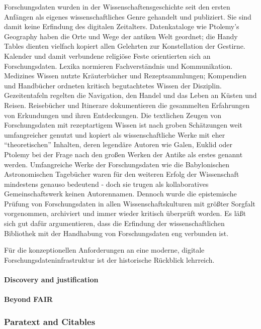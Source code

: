 Forschungsdaten wurden in der Wissenschaftensgeschichte seit den ersten
Anfängen als eigenes wissenschaftliches Genre gehandelt und publiziert.
Sie sind damit keine Erfindung des digitalen Zeitalters. Datenkataloge
wie Ptolemy's Geography haben die Orte und Wege der antiken Welt
geordnet; die Handy Tables dienten vielfach kopiert allen Gelehrten zur
Konstellation der Gestirne. Kalender und damit verbundene religiöse
Feste orientierten sich an Forschungsdaten. Lexika normieren
Fachverständnis und Kommunikation. Medizines Wissen nutzte Kräuterbücher
und Rezeptsammlungen; Kompendien und Handbücher ordneten kritisch
begutachtetes Wissen der Disziplin. Gezeitentafeln regelten die
Navigation, den Handel und das Leben an Küsten und Reisen. Reisebücher
und Itinerare dokumentieren die gesammelten Erfahrungen von Erkundungen
und ihren Entdeckungen. Die textlichen Zeugen von Forschungsdaten mit
rezeptartigem Wissen ist nach groben Schätzungen weit umfangreicher
genutzt und kopiert als wissenschaftliche Werke mit eher
``theoretischen'' Inhalten, deren legendäre Autoren wie Galen, Euklid
oder Ptolemy bei der Frage nach den großen Werken der Antike als erstes
genannt werden. Umfangreiche Werke der Forschungsdaten wie die
Babylonischen Astronomischen Tagebücher waren für den weiteren Erfolg
der Wissenschaft mindestens genauso bedeutend - doch sie trugen als
kollaboratives Gemeinschaftswerk keinen Autorennamen. Dennoch wurde die
epistemische Prüfung von Forschungsdaten in allen Wissenschaftskulturen
mit größter Sorgfalt vorgenommen, archiviert und immer wieder kritisch
überprüft worden. Es läßt sich gut dafür argumentieren, dass die
Erfindung der wissenschaftlichen Bibliothek mit der Handhabung von
Forschungsdaten eng verbunden ist.

Für die konzeptionellen Anforderungen an eine moderne, digitale
Forschungsdateninfrastruktur ist der historische Rückblick lehrreich.

\hypertarget{discovery-and-justification}{%
\paragraph{Discovery and
justification}\label{discovery-and-justification}}

\hypertarget{beyond-fair}{%
\paragraph{Beyond FAIR}\label{beyond-fair}}

\hypertarget{paratext-and-citables}{%
\subsubsection{Paratext and Citables}\label{paratext-and-citables}}

